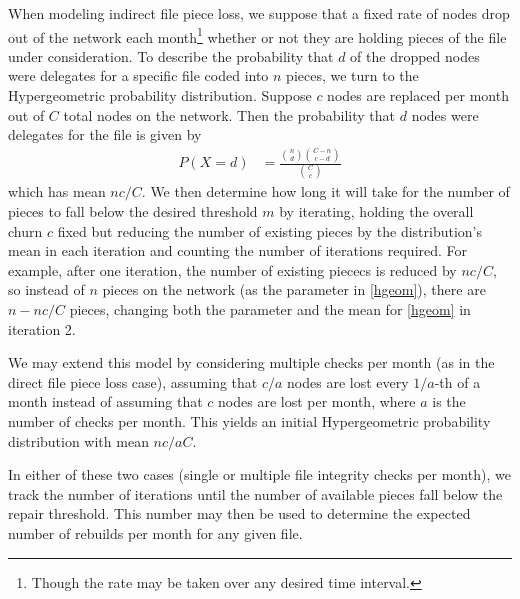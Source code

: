 When modeling indirect file piece loss, we suppose that a fixed rate of nodes drop out of the network each month\footnote{Though the rate may be taken over any desired time interval.} whether or not they are holding pieces of the file under consideration. To describe the probability that $d$ of the dropped nodes were delegates for a specific file coded into $n$ pieces, we turn to the Hypergeometric probability distribution. Suppose $c$ nodes are replaced per month out of $C$ total nodes on the network. Then the probability that $d$ nodes were delegates for the file is given by 
\begin{align}
    P(X=d)&=\frac{\binom{n}{d}\binom{C-n}{c-d}}{\binom{C}{c}}\label{hgeom}
\end{align}
which has mean $nc/C$. We then determine how long it will take for the number of pieces to fall below the desired threshold $m$ by iterating, holding the overall churn $c$ fixed but reducing the number of existing pieces by the distribution's mean in each iteration and counting the number of iterations required. For example, after one iteration, the number of existing piececs is reduced by $nc/C$, so instead of $n$ pieces on the network (as the parameter in \eqref{hgeom}), there are $n-nc/C$ pieces, changing both the parameter and the mean for \eqref{hgeom} in iteration 2.

We may extend this model by considering multiple checks per month (as in the direct file piece loss case), assuming that $c/a$ nodes are lost every $1/a$-th of a month instead of assuming that $c$ nodes are lost per month, where $a$ is the number of checks per month. This yields an initial Hypergeometric probability distribution with mean $nc/aC$.

In either of these two cases (single or multiple file integrity checks per month), we track the number of iterations until the number of available pieces fall below the repair threshold. This number may then be used to determine the expected number of rebuilds per month for any given file.